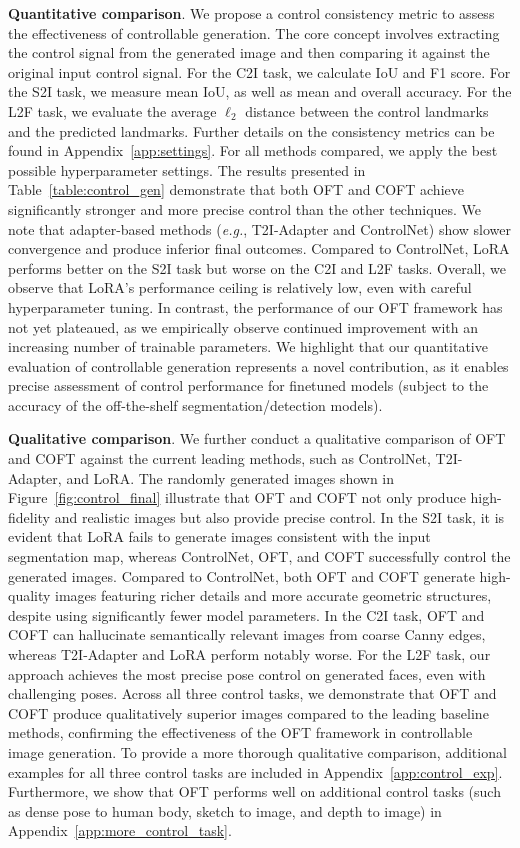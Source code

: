 \textbf{Quantitative comparison}. We propose a control consistency metric to assess the effectiveness of controllable generation. The core concept involves extracting the control signal from the generated image and then comparing it against the original input control signal. For the C2I task, we calculate IoU and F1 score. For the S2I task, we measure mean IoU, as well as mean and overall accuracy. For the L2F task, we evaluate the average $\ell_2$ distance between the control landmarks and the predicted landmarks. Further details on the consistency metrics can be found in Appendix~\ref{app:settings}. For all methods compared, we apply the best possible hyperparameter settings. The results presented in Table~\ref{table:control_gen} demonstrate that both OFT and COFT achieve significantly stronger and more precise control than the other techniques. We note that adapter-based methods (\emph{e.g.}, T2I-Adapter and ControlNet) show slower convergence and produce inferior final outcomes. Compared to ControlNet, LoRA performs better on the S2I task but worse on the C2I and L2F tasks. Overall, we observe that LoRA’s performance ceiling is relatively low, even with careful hyperparameter tuning. In contrast, the performance of our OFT framework has not yet plateaued, as we empirically observe continued improvement with an increasing number of trainable parameters. We highlight that our quantitative evaluation of controllable generation represents a novel contribution, as it enables precise assessment of control performance for finetuned models (subject to the accuracy of the off-the-shelf segmentation/detection models).

\textbf{Qualitative comparison}. We further conduct a qualitative comparison of OFT and COFT against the current leading methods, such as ControlNet, T2I-Adapter, and LoRA. The randomly generated images shown in Figure~\ref{fig:control_final} illustrate that OFT and COFT not only produce high-fidelity and realistic images but also provide precise control. In the S2I task, it is evident that LoRA fails to generate images consistent with the input segmentation map, whereas ControlNet, OFT, and COFT successfully control the generated images. Compared to ControlNet, both OFT and COFT generate high-quality images featuring richer details and more accurate geometric structures, despite using significantly fewer model parameters. In the C2I task, OFT and COFT can hallucinate semantically relevant images from coarse Canny edges, whereas T2I-Adapter and LoRA perform notably worse. For the L2F task, our approach achieves the most precise pose control on generated faces, even with challenging poses. Across all three control tasks, we demonstrate that OFT and COFT produce qualitatively superior images compared to the leading baseline methods, confirming the effectiveness of the OFT framework in controllable image generation. To provide a more thorough qualitative comparison, additional examples for all three control tasks are included in Appendix~\ref{app:control_exp}. Furthermore, we show that OFT performs well on additional control tasks (such as dense pose to human body, sketch to image, and depth to image) in Appendix~\ref{app:more_control_task}.

